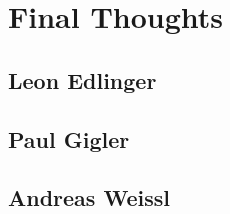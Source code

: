 \section{Final Thoughts}

\subsection{Leon Edlinger}

\subsection{Paul Gigler}

\subsection{Andreas Weissl}